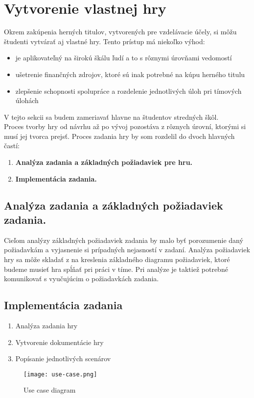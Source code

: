 \section{Vytvorenie vlastnej hry}\label{vytvorenie-vlastnej-hry}
Okrem zakúpenia herných titulov, vytvorených pre vzdelávacie účely, si môžu študenti vytvárať aj vlastné hry.
Tento prístup má niekoľko výhod: 
	\begin{itemize}
		\item je aplikovateľný na širokú škálu ľudí a to s rôznymi úrovňami vedomostí
		\item ušetrenie finančných zdrojov, ktoré sú inak potrebné na kúpu herného titulu
		\item zlepšenie schopnosti spolupráce a rozdelenie jednotlivých úloh pri tímových úlohách 
	\end{itemize}
V tejto sekcii sa budem zameriavať hlavne na študentov stredných škôl.\\
Proces tvorby hry od návrhu až po vývoj pozostáva z rôznych úrovní, ktorými si musí jej tvorca prejsť.
Proces zadania hry by som rozdelil do dvoch hlavných častí:
	\begin{enumerate}
		\item \textbf{Analýza zadania a základných požiadaviek pre hru.}
		\item \textbf{Implementácia zadania.}
	\end{enumerate}


	\subsection{Analýza zadania a základných požiadaviek zadania.}\label{analyza-zadania}
	Cieľom analýzy základných požiadaviek zadania by malo byť porozumenie 
	daný požiadavkám a vyjasnenie si prípadných nejasností v zadaní. Analýza požiadaviek 
	hry sa môže skladať z na kreslenia základného diagramu požiadaviek,
	ktoré budeme musieť hra spĺňať pri práci v tíme. Pri analýze je taktiež potrebné komunikovať 
	s vyučujúcim o požiadavkách zadania.


	\subsection{Implementácia zadania}\label{implementacia-zadania}
	\begin{enumerate}
		\item Analýza zadania hry
		\item Vytvorenie dokumentácie hry
		\item Popísanie jednotlivých scenárov
	\end{enumerate}

	\begin{figure}
		\texttt{[image: use-case.png]}
		\caption{Use case diagram}
		\label{use-case-tvorba-hry}
	\end{figure}

